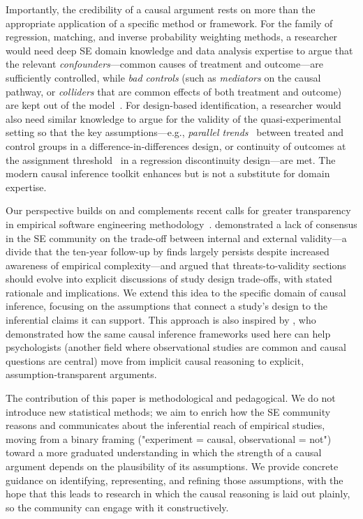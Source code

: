 Importantly, the credibility of a causal argument rests on more than the appropriate application of a specific method or framework. 
For the family of regression, matching, and inverse probability weighting methods, a researcher would need deep SE domain knowledge and data analysis expertise to argue that the relevant \emph{confounders}---common causes of treatment and outcome---are sufficiently controlled, while \emph{bad controls} (such as \emph{mediators} on the causal pathway, or \emph{colliders} that are common effects of both treatment and outcome) are kept out of the model~\cite{angrist2009mostly}.
For design-based identification, a researcher would also need similar knowledge to argue for the validity of the quasi-experimental setting so that the key assumptions---e.g., \emph{parallel trends}~\cite{roth2023whats} between treated and control groups in a difference-in-differences design, or continuity of outcomes at the assignment threshold~\cite{cunningham2021causal} in a regression discontinuity design---are met.
The modern causal inference toolkit enhances but is not a substitute for domain expertise.

Our perspective builds on and complements recent calls for greater transparency in empirical software engineering methodology~\cite{DBLP:conf/icse/SiegmundSA15, DBLP:conf/icse/MailachSAS26, DBLP:journals/tosem/RobillardAEGLNNSSS24}.
\citet{DBLP:conf/icse/SiegmundSA15} demonstrated a lack of consensus in the SE community on the trade-off between internal and external validity---a divide that the ten-year follow-up by \citet{DBLP:conf/icse/MailachSAS26} finds largely persists despite increased awareness of empirical complexity---and \citet{DBLP:journals/tosem/RobillardAEGLNNSSS24} argued that threats-to-validity sections should evolve into explicit discussions of study design trade-offs, with stated rationale and implications.
We extend this idea to the specific domain of causal inference, focusing on the assumptions that connect a study's design to the inferential claims it can support. 
This approach is also inspired by \citet{rohrer2018thinking}, who demonstrated how the same causal inference frameworks used here can help psychologists (another field where observational studies are common and causal questions are central) move from implicit causal reasoning to explicit, assumption-transparent arguments.

The contribution of this paper is methodological and pedagogical. 
We do not introduce new statistical methods; we aim to enrich how the SE community reasons and communicates about the inferential reach of empirical studies, moving from a binary framing ("experiment = causal, observational = not") toward a more graduated understanding in which the strength of a causal argument depends on the plausibility of its assumptions. 
We provide concrete guidance on identifying, representing, and refining those assumptions, with the hope that this leads to research in which the causal reasoning is laid out plainly, so the community can engage with it constructively.

